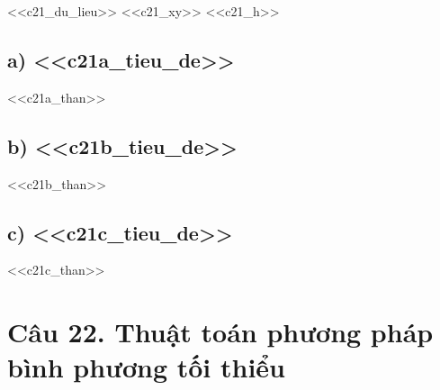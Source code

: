 \documentclass[11pt,a4paper]{article}
\begin{document}
<<c21_du_lieu>>
<<c21_xy>>
<<c21_h>>

\subsection{a) <<c21a_tieu_de>>}
<<c21a_than>>

\subsection{b) <<c21b_tieu_de>>}
<<c21b_than>>

\subsection{c) <<c21c_tieu_de>>}
<<c21c_than>>

\section{Câu 22. Thuật toán phương pháp bình phương tối thiểu}
\end{document}
